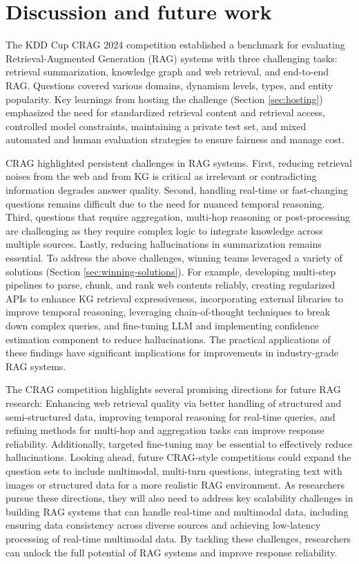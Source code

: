 \section{Discussion and future work}
\label{sec:futurework}
The KDD Cup CRAG 2024 competition established a benchmark for evaluating Retrieval-Augmented Generation (RAG) systems with three challenging tasks: retrieval summarization, knowledge graph and web retrieval, and end-to-end RAG. Questions covered various domains, dynamism levels, types, and entity popularity. Key learnings from hosting the challenge (Section  \ref{sec:hosting}) emphasized the need for standardized retrieval content and retrieval access, controlled model constraints, maintaining a private test set, and mixed automated and human evaluation strategies to ensure fairness and manage cost.

CRAG highlighted persistent challenges in RAG systems. First, reducing retrieval noises from the web and from KG is critical as irrelevant or contradicting information degrades answer quality. Second, handling real-time or fast-changing questions remains difficult due to the need for nuanced temporal reasoning. Third, questions that require aggregation, multi-hop reasoning or post-processing are challenging as they require complex logic to integrate knowledge across multiple sources. Lastly, reducing hallucinations in summarization remains essential. To address the above challenges, winning teams leveraged a variety of solutions (Section \ref{sec:winning-solutions}). For example, developing multi-step pipelines to parse, chunk, and rank web contents reliably, creating regularized APIs to enhance KG retrieval expressiveness, incorporating external libraries to improve temporal reasoning, leveraging chain-of-thought techniques to break down complex queries, and fine-tuning LLM and implementing confidence estimation component to reduce hallucinations. The practical applications of these findings have significant implications for improvements in industry-grade RAG systems.

The CRAG competition highlights several promising directions for future RAG research: Enhancing web retrieval quality via better handling of structured and semi-structured data, improving temporal reasoning for real-time queries, and refining methods for multi-hop and aggregation tasks can improve response reliability. Additionally, targeted fine-tuning may be essential to effectively reduce hallucinations. Looking ahead, future CRAG-style competitions could expand the question sets to include multimodal, multi-turn questions, integrating text with images or structured data for a more realistic RAG environment. As researchers pursue these directions, they will also need to address key scalability challenges in building RAG systems that can handle real-time and multimodal data, including ensuring data consistency across diverse sources and achieving low-latency processing of real-time multimodal data. By tackling these challenges, researchers can unlock the full potential of RAG systems and improve response reliability.